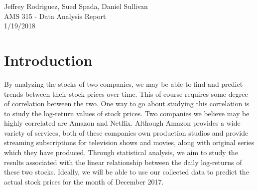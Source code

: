 \documentclass[12pt]{article}
\begin{document}
\thispagestyle{empty}
\begin{center}
Jeffrey Rodriguez, Sued Spada, Daniel Sullivan
\\AMS 315 - Data Analysis Report\\1/19/2018
\end{center}

\section*{Introduction}
By analyzing the stocks of two companies, we may be able to find and predict trends between their stock prices over time. This of course requires some degree of correlation between the two. One way to go about studying this correlation is to study the log-return values of stock prices. Two companies we believe may be highly correlated are Amazon and Netflix. Although Amazon provides a wide variety of services, both of these companies own production studios and provide streaming subscriptions for television shows and movies, along with original series which they have produced. Through statistical analysis, we aim to study the results associated with the linear relationship between the daily log-returns of these two stocks. Ideally, we will be able to use our collected data to predict the actual stock prices for the month of December 2017.
\end{document}
